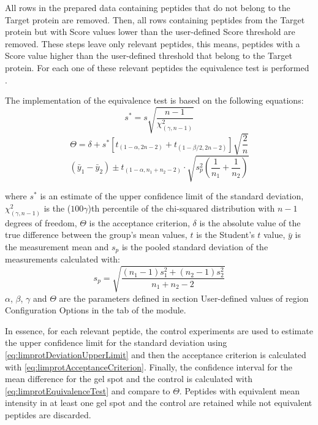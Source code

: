 All rows in the prepared data containing peptides that do not belong to the Target
protein are removed. Then, all rows containing peptides from the Target protein
but with Score values lower than the user-defined Score threshold are removed. These
steps leave only relevant peptides, this means, peptides with a Score value higher
than the user-defined threshold that belong to the Target protein. For each one of
these relevant peptides the equivalence test is performed \cite{Limentani2005a}.

The implementation of the equivalence test is based on the following equations:
\begin{equation}
    \label{eq:limprotDeviationUpperLimit}
    s^* = s\sqrt{\frac{n-1}{\chi^2_{(\gamma, n-1)}}}
\end{equation}
\begin{equation}
\label{eq:limprotAcceptanceCriterion}
\Theta = \delta + s^*\left[t_{(1-\alpha, 2n-2)} + t_{(1-\beta/2, 2n-2)}\right]\sqrt{\frac{2}{n}}
\end{equation}
\begin{equation}
\label{eq:limprotEquivalenceTest}
(\bar{y}_1 - \bar{y}_2) \pm t_{(1-\alpha, n_1+n_2-2)} \cdot \sqrt{s^2_p\left(\frac{1}{n_1}+\frac{1}{n_2}\right)}
\end{equation}

where $s^*$ is an estimate of the upper confidence limit of the standard deviation,
$\chi^2_{(\gamma, n-1)}$ is the ($100\gamma$)th percentile of the chi-squared distribution
with $n-1$ degrees of freedom, $\Theta$ is the acceptance criterion, $\delta$ is the
absolute value of the true difference between the group's mean values, $t$ is the
Student's $t$ value, $\bar{y}$ is the measurement mean and $s_p$ is the pooled standard
deviation of the measurements calculated with:
\begin{equation}
\label{eq:poolStDev}
s_p =  \sqrt{\frac{(n_1-1)s^2_1+(n_2-1)s^2_2}{n_1+n_2-2}}
\end{equation}
$\alpha$, $\beta$, $\gamma$ and $\Theta$ are the parameters defined in section
User-defined values of region Configuration Options in the tab of the module.

In essence, for each relevant peptide, the control experiments are used to estimate
the upper confidence limit for the standard deviation using \autoref{eq:limprotDeviationUpperLimit}
and then the acceptance criterion is calculated with \autoref{eq:limprotAcceptanceCriterion}.
Finally, the confidence interval for the mean difference for the gel spot and the
control is calculated with \autoref{eq:limprotEquivalenceTest} and compare to $\Theta$.
Peptides with equivalent mean intensity in at least one gel spot and the control
are retained while not equivalent peptides are discarded.

